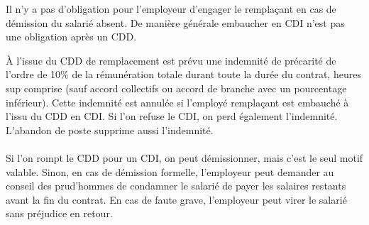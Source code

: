 	Il n'y a pas d’obligation pour l’employeur d’engager le remplaçant en cas de démission du salarié absent.
	De manière générale embaucher en CDI n'est pas une obligation après un CDD.

	À l’issue du CDD de remplacement est prévu une indemnité de précarité de l’ordre de 10\% de la rémunération totale durant toute la durée du contrat, heures sup comprise (sauf accord collectifs ou accord de branche avec un pourcentage inférieur).
	Cette indemnité est annulée si l’employé remplaçant est embauché à l’issu du CDD en CDI.
	Si l’on refuse le CDI, on perd également l’indemnité.
	L’abandon de poste supprime aussi l’indemnité.

	\paragraph{}
	Si l’on rompt le CDD pour un CDI, on peut démissionner, mais c'est le seul motif valable.
	Sinon, en cas de démission formelle, l’employeur peut demander au conseil des prud’hommes de condamner le salarié de payer les salaires restants avant la fin du contrat.
	En cas de faute grave, l’employeur peut virer le salarié sans préjudice en retour.